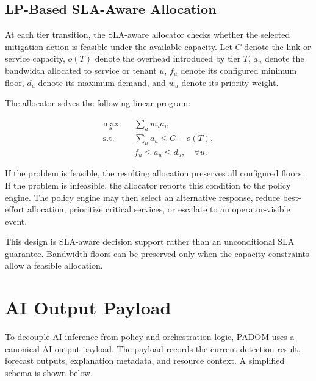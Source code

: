 \documentclass[12pt, a4paper, reqno, oneside]{book}
\newcommand{\padonap}{\textsc{PADOM}}
\begin{document}
\subsection{LP-Based SLA-Aware Allocation}
\label{subsec:lp}

At each tier transition, the SLA-aware allocator checks whether the selected
mitigation action is feasible under the available capacity. Let \(C\) denote
the link or service capacity, \(o(T)\) denote the overhead introduced by tier
\(T\), \(a_u\) denote the bandwidth allocated to service or tenant \(u\),
\(f_u\) denote its configured minimum floor, \(d_u\) denote its maximum demand,
and \(w_u\) denote its priority weight.

The allocator solves the following linear program:

\begin{equation}
\begin{aligned}
  \max_{\mathbf{a}} &\quad \sum_{u} w_u a_u \\[4pt]
  \text{s.t.} &\quad \sum_{u} a_u \leq C - o(T), \\
  &\quad f_u \leq a_u \leq d_u, \quad \forall u.
\end{aligned}
\label{eq:lp}
\end{equation}

If the problem is feasible, the resulting allocation preserves all configured
floors. If the problem is infeasible, the allocator reports this condition to
the policy engine. The policy engine may then select an alternative response,
reduce best-effort allocation, prioritize critical services, or escalate to an
operator-visible event.

This design is SLA-aware decision support rather than an unconditional SLA
guarantee. Bandwidth floors can be preserved only when the capacity constraints
allow a feasible allocation.

\section{AI Output Payload}
\label{sec:payload}

To decouple AI inference from policy and orchestration logic, \padonap{} uses
a canonical AI output payload. The payload records the current detection
result, forecast outputs, explanation metadata, and resource context. A
simplified schema is shown below.
\end{document}
